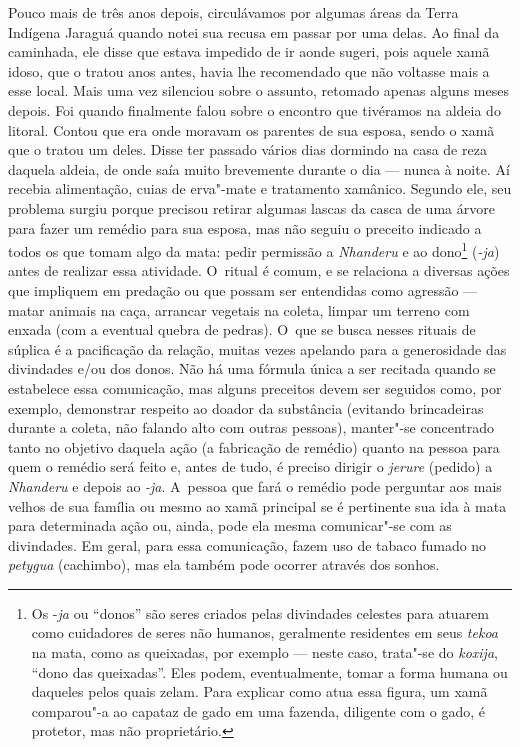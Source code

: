 Pouco mais de três anos depois, circulávamos por algumas áreas da Terra
Indígena Jaraguá quando notei sua recusa em passar por uma delas. Ao
final da caminhada, ele disse que estava impedido de ir aonde sugeri,
pois aquele xamã idoso, que o tratou anos antes, havia lhe recomendado
que não voltasse mais a esse local. Mais uma vez silenciou sobre o
assunto, retomado apenas alguns meses depois. Foi quando finalmente
falou sobre o encontro que tivéramos na aldeia do litoral. Contou que
era onde moravam os parentes de sua esposa, sendo o xamã que o tratou
um deles. Disse ter passado vários dias dormindo na casa de reza
daquela aldeia, de onde saía muito brevemente durante o dia --- nunca à
noite. Aí recebia alimentação, cuias de erva"-mate e tratamento
xamânico. Segundo ele, seu problema surgiu porque precisou retirar
algumas lascas da casca de uma árvore para fazer um remédio para sua
esposa, mas não seguiu o preceito indicado a todos os que tomam algo da
mata: pedir permissão a \emph{Nhanderu} e ao dono\footnote{Os -\emph{ja} ou ``donos''
são seres criados pelas divindades celestes para atuarem como
cuidadores de seres não humanos, geralmente residentes em seus \emph{tekoa} na
mata, como as queixadas, por exemplo --- neste caso, trata"-se do \emph{koxija},
``dono das queixadas''. Eles podem, eventualmente, tomar a forma humana
ou daqueles pelos quais zelam. Para explicar como atua essa figura, um
xamã comparou"-a ao capataz de gado em uma fazenda, diligente com o
gado, é protetor, mas não proprietário.} (\emph{-ja}) antes de realizar essa
atividade. O~ritual é comum, e se relaciona a diversas ações que
impliquem em predação ou que possam ser entendidas como agressão ---
matar animais na caça, arrancar vegetais na coleta, limpar um terreno
com enxada (com a eventual quebra de pedras). O~que se busca nesses
rituais de súplica é a pacificação da relação, muitas vezes apelando
para a generosidade das divindades e/ou dos donos. Não há uma fórmula
única a ser recitada quando se estabelece essa comunicação, mas alguns
preceitos devem ser seguidos como, por exemplo, demonstrar respeito ao
doador da substância (evitando brincadeiras durante a coleta, não
falando alto com outras pessoas), manter"-se concentrado tanto no
objetivo daquela ação (a fabricação de remédio) quanto na pessoa para
quem o remédio será feito e, antes de tudo, é preciso dirigir o \emph{jerure}
(pedido) a \emph{Nhanderu} e depois ao \emph{-ja}. A~pessoa que fará o remédio pode
perguntar aos mais velhos de sua família ou mesmo ao xamã principal se
é pertinente sua ida à mata para determinada ação ou, ainda, pode ela
mesma comunicar"-se com as divindades. Em geral, para essa comunicação,
fazem uso de tabaco fumado no \emph{petygua} (cachimbo), mas ela também
pode ocorrer através dos sonhos. 

